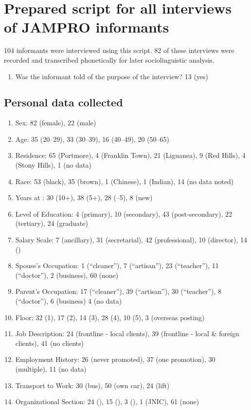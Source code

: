 \chapter{Prepared script for all interviews of JAMPRO informants}\label{appendix1}
104 informants were interviewed using this script. 82 of these interviews were recorded and transcribed phonetically for later sociolinguistic analysis.

\begin{enumerate}
	\item  Was the informant told of the purpose of the interview? 13 (yes)
\end{enumerate}

\section{Personal data collected}
\begin{enumerate}
\item Sex: 82 (female), 22 (male)
\item Age: 35 (20--29), 33 (30--39), 16 (40--49), 20 (50--65)
\item Residence: 65 (Portmore), 4 (Franklin Town), 21 (Liguanea), 9 (Red Hills), 4 (Stony Hills), 1 (no data)
\item Race: 53 (black), 35 (brown), 1 (Chinese), 1 (Indian), 14 (no data noted)
\item Years at : 30 (10+), 38 (5+), 28 (–5), 8 (new)
\item Level of Education: 4 (primary), 10 (secondary), 43 (post-secondary), 22 (tertiary), 24 (graduate)
\item Salary Scale: 7 (ancillary), 31 (secretarial), 42 (professional), 10 (director), 14 ()
\item Spouse’s Occupation: 1 (“cleaner”), 7 (“artisan”), 23 (“teacher”), 11 (“doctor”), 2 (business), 60 (none)
\item Parent’s Occupation: 17 (“cleaner”), 39 (“artisan”), 30 (“teacher”), 8 (“doctor”), 6 (business) 4 (no data)
\item  Floor: 32 (1), 17 (2), 14 (3), 28 (4), 10 (5), 3 (overseas posting)
\item  Job Description: 24 (frontline - local clients), 39 (frontline - local \& foreign clients), 41 (no clients)
\item  Employment History: 26 (never promoted), 37 (one promotion), 30 (multiple), 11 (no data)
\item  Transport to Work: 30 (bus), 50 (own car), 24 (lift)
\item  Organizational Section: 24 (), 15 (), 3 (), 1 (JNIC), 61 (none)
\end{enumerate}


